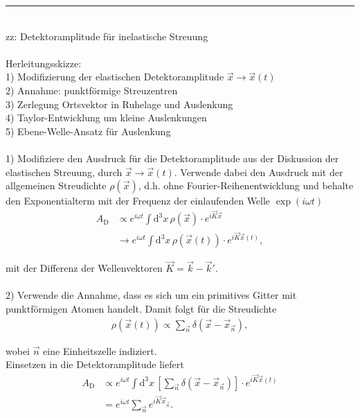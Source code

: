 \documentclass{article}
\newcommand{\diff}{\mathrm{d}}
\newcommand{\lreck}[1]{\left[#1\right]}
\begin{document}
\newpage


{\color{violet}
\hrule
	\\
	zz: Detektoramplitude für inelastische Streuung \\
	\\
	Herleitungsskizze:\\
	1) Modifizierung der elastischen Detektoramplitude $\vec{x} \to \vec{x}(t)$\\
	2) Annahme: punktförmige Streuzentren \\
	3) Zerlegung Ortsvektor in Ruhelage und Auslenkung \\
	4) Taylor-Entwicklung um kleine Auslenkungen \\
	5) Ebene-Welle-Ansatz für Auslenkung \\
	\\
	1) Modifiziere den Ausdruck für die Detektoramplitude aus der Diskussion der elastischen Streuung, durch $\vec{x} \to \vec{x}(t)$. Verwende dabei den Ausdruck mit der allgemeinen Streudichte $\rho(\vec{x})$, d.h. ohne Fourier-Reihenentwicklung und behalte den Exponentialterm mit der Frequenz der einlaufenden Welle $\exp(i\omega t)$
		\begin{align*}
			A_\text{D} &\propto e^{i\omega t} \int \diff^3 x \, \rho(\vec{x}) \cdot e^{i\vec{K}\vec{x}} \\
			&\to e^{i\omega t} \int \diff^3 x \, \rho(\vec{x}(t)) \cdot e^{i\vec{K}\vec{x}(t)},
		\end{align*}
	
	mit der Differenz der Wellenvektoren $\vec{K} = \vec{k} - \vec{k}'$.\\
	\\
	2) Verwende die Annahme, dass es sich um ein primitives Gitter mit punktförmigen Atomen handelt. Damit folgt für die Streudichte
		\begin{align*}
			\rho(\vec{x}(t)) \propto \sum_{\vec{n}} \delta(\vec{x} - \vec{x}_{\vec{n}}),
		\end{align*}
	
	wobei $\vec{n}$ eine Einheitszelle indiziert.\\
	Einsetzen in die Detektoramplitude liefert
		\begin{align*}
			A_\text{D} &\propto e^{i\omega t} \int \diff^3 x \, \lreck{ \sum_{\vec{n}} \delta(\vec{x} - \vec{x}_{\vec{n}}) } \cdot e^{i\vec{K}\vec{x}(t)} \\
			&= e^{i\omega t} \sum_{\vec{n}} e^{i\vec{K}\vec{x}_{\vec{n}}}.
		\end{align*}
		
}
\end{document}
